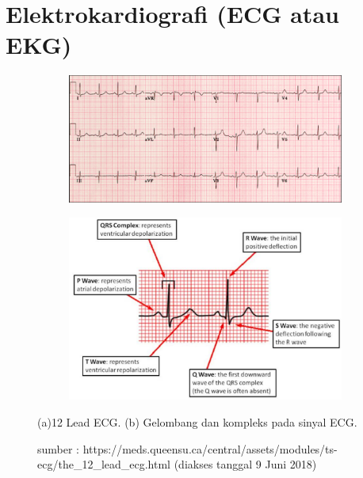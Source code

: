 \section{Elektrokardiografi (ECG atau EKG)}

\begin{figure}[ht]
\centering
\begin{subfigure}[b]{0.49\textwidth}
\includegraphics[width=\textwidth]{Normal_ECG}
\caption{}
\end{subfigure}             
\begin{subfigure}[b]{0.49\textwidth}
\includegraphics[width=\textwidth]{wave_and_complex}
\caption{}
\end{subfigure}
\caption{(a)12 Lead ECG. (b) Gelombang dan kompleks pada sinyal ECG.}
\caption*{sumber : https://meds.queensu.ca/central/assets/modules/ts-ecg/the\_12\_lead\_ecg.html \citep{web3} (diakses tanggal 9 Juni 2018)}
\label{fig:ecg_wave}
\end{figure}

